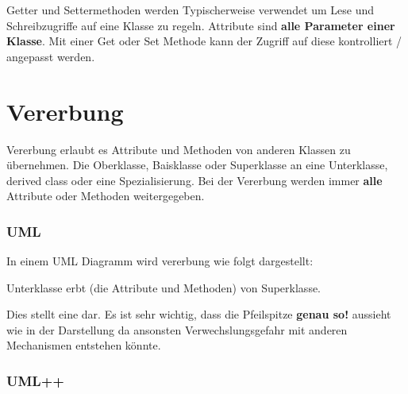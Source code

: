 Getter und Settermethoden werden Typischerweise verwendet um Lese und Schreibzugriffe auf eine Klasse zu regeln. 
Attribute sind \textbf{alle Parameter einer Klasse}. 
Mit einer Get oder Set Methode kann der Zugriff auf diese kontrolliert / angepasst werden.\\



\section{Vererbung}

Vererbung erlaubt es Attribute und Methoden von anderen Klassen zu übernehmen. 
Die Oberklasse, Baisklasse oder Superklasse  an eine Unterklasse, derived class oder eine Spezialisierung. 
Bei der Vererbung werden immer \textbf{alle} Attribute oder Methoden weitergegeben. 

\subsubsection{UML}

In einem UML Diagramm wird vererbung wie folgt dargestellt:\\
\noindent
\begin{minipage}{0.6\columnwidth}
\begin{center}
\end{center}
\end{minipage}
\begin{minipage}{0.4\columnwidth}

Unterklasse erbt (die Attribute und Methoden) von Superklasse. 

\end{minipage}

Dies stellt eine  dar. 
Es ist sehr wichtig, dass die Pfeilspitze \colorbox{red!65}{\textbf{genau so!}} aussieht wie in der Darstellung da ansonsten Verwechslungsgefahr mit anderen Mechanismen entstehen könnte.

\subsubsection{UML++}

